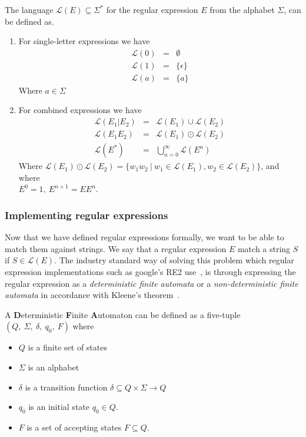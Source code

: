 \documentclass[12pt]{article}
\theoremstyle{definition}
\begin{document}
\begin{definition} The language $\mathcal{L}(E) \subseteq \Sigma^*$ for the regular expression $E$ from the alphabet $\Sigma$, can be defined as.

	\begin{enumerate}
		\item For single-letter expressions we have
			\begin{eqnarray}
				\mathcal{L}(0) &=& \emptyset \\
				\mathcal{L}(1) &=& \{\epsilon\} \\
				\mathcal{L}(a) &=& \{a\}
			\end{eqnarray}
			Where $a \in \Sigma$
			
		\item For combined expressions we have
			\begin{eqnarray}
				\mathcal{L}(E_1|E_2) &=& \mathcal{L}(E_1) \cup \mathcal{L}(E_2) \\
				\mathcal{L}(E_1E_2) &=& \mathcal{L}(E_1) \odot \mathcal{L}(E_2) \\
				\mathcal{L}(E^*) &=& \bigcup^{\infty}_{n = 0}\mathcal{L}(E^n)
			\end{eqnarray}
			Where $\mathcal{L}(E_1) \odot \mathcal{L}(E_2) = \{w_1w_2 \ |\  w_1 \in \mathcal{L}(E_1), w_2 \in \mathcal{L}(E_2)\}$, and where \\
			$E^0 = 1, \ E^{n+1} = EE^n$.
	\end{enumerate}
\end{definition}


\subsubsection{Implementing regular expressions}

Now that we have defined regular expressions formally, we want to be able to match them against strings. We say that a regular expression $E$ match a string $S$ if $S \in \mathcal{L}(E)$.
The industry standard way of solving this problem which regular expression implementations such as google's RE2 use~\cite{matching-in-the-wild}, is through expressing the regular expression as a \textit{deterministic finite automata} or a \textit{non-deterministic finite automata} in accordance with Kleene's theorem~\cite{kleenes-theorem}. 

\begin{definition} A \textbf{D}eterministic \textbf{F}inite \textbf{A}utomaton can be defined as a five-tuple $(Q,\ \Sigma,\ \delta,\ q_0,\ F)$ where
\label{dfa definition}

\begin{itemize}
	\item $Q$ is a finite set of states
	\item $\Sigma$ is an alphabet
	\item $\delta$ is a transition function $\delta \subseteq Q \times \Sigma \rightarrow Q$
	\item $q_0$ is an initial state $q_0 \in Q$.
	\item $F$ is a set of accepting states $F \subseteq Q$.
\end{itemize}
\end{definition}
 
\end{document}
